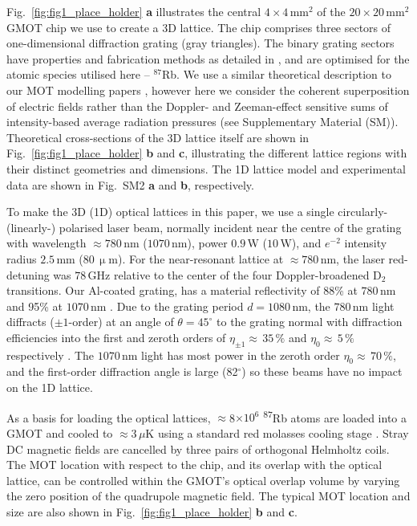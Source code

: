 \documentclass[aps,prl,floatfix,showpacs,twocolumn,amsmath,amssymb,superscriptaddress]{revtex4-2}
\begin{document}
Fig.~\ref{fig:fig1_place_holder} \textbf{a} illustrates the central $4\times4\,\textrm{mm}^2$ of the $20\times20\,\textrm{mm}^2$ GMOT chip we use to create a 3D lattice. The chip comprises three sectors of one-dimensional diffraction grating (gray triangles). 
The binary grating sectors have properties and fabrication methods as detailed in \cite{GMOT1_Nshii2013,Cotter2016,McGilligan2016,Sr_grating_design_Burrow2023}, and are optimised for the atomic species utilised here -- $^{87}$Rb.  
We use a similar theoretical description to our MOT modelling papers \cite{Vangeleyn2009,McGilligan2015}, however here we consider the coherent superposition of electric fields rather than the Doppler- and Zeeman-effect sensitive sums of intensity-based average radiation pressures (see Supplementary Material (SM)). Theoretical cross-sections of the 3D lattice itself are shown in Fig.~\ref{fig:fig1_place_holder} \textbf{b} and \textbf{c}, illustrating the different lattice regions with their distinct geometries and dimensions. The 1D lattice model and experimental data are shown in Fig.~SM2 \textbf{a} and \textbf{b}, respectively.

To make the 3D (1D) optical lattices in this paper, we use a single circularly- (linearly-) polarised  laser beam, normally incident near the centre of the grating with wavelength $\approx 780\,$nm ($1070\,$nm),  power $0.9\,$W ($10\,$W), and $e^{-2}$ intensity radius %
$2.5\,$mm ($80\,\upmu$m). For the near-resonant lattice at $\approx 780\,$nm, the laser red-detuning was $78\,$GHz relative to the center of the four Doppler-broadened D$_2$ transitions. Our Al-coated grating, has a material reflectivity of 88\% at $780\,$nm and 95\% at $1070\,$nm \cite{Handbook_of_Optical_materials}. Due to the grating period $d=1080\,$nm, the $780\,$nm light diffracts ($\pm 1$-order) at an angle of $\theta=45^\circ$ to the grating normal with diffraction efficiencies into the first and zeroth orders of $\eta_{\pm1}\approx\,35\,\%$ and  $\eta_{0}\approx\,5\,\%$ respectively \cite{McGilligan2016}. The $1070\,$nm light has most power in the zeroth order $\eta_{0}\approx\,70\,\%$, and the first-order diffraction angle is  large (82$^\circ$) so these beams have no impact on the 1D lattice.

As a basis for loading the optical lattices, $\approx$8$\times10^{6}$ \textsuperscript{87}Rb atoms are loaded into a GMOT and cooled to $\approx$3$\,\mu$K using a standard red molasses cooling stage \cite{GMOT1_Nshii2013,GMOT2_McGilligan2017}. Stray DC magnetic fields are cancelled by three pairs of orthogonal Helmholtz coils. The MOT location with respect to the chip, and its overlap with the optical lattice, can be controlled within the GMOT's optical overlap volume by varying the zero position of the quadrupole magnetic field. 
The typical MOT location and size are also shown in Fig.~\ref{fig:fig1_place_holder} \textbf{b} and \textbf{c}.
\end{document}
